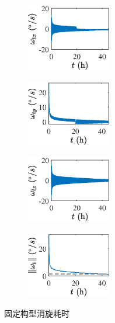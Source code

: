 \documentclass[lang=chs, degree=master, blindreview=false, winfonts=true]{yanputhesis}
\begin{document}
\begin{figure}[htb!]
	\centering
	\begin{minipage}[t]{0.96\textwidth}
		\centering
		\begin{subfigure}[t]{0.23\textwidth}
			\centering
			\includegraphics[width = 1.475in]{picture/posefix_omega_x.eps}
			\caption{ }
			\label{fig:posefixdetumb_time(a)}
		\end{subfigure}\hfill
		\begin{subfigure}[t]{0.23\textwidth}
			\centering
			\includegraphics[width = 1.475in]{picture/posefix_omega_y.eps}
			\caption{ }
			\label{fig:posefixdetumb_time(c)}
		\end{subfigure}\hfill
		\begin{subfigure}[t]{0.23\textwidth}
			\centering
			\includegraphics[width = 1.475in]{picture/posefix_omega_z.eps}
			\caption{ }
			\label{fig:posefixdetumb_time(e)}
		\end{subfigure}\hfill
		\begin{subfigure}[t]{0.23\textwidth}
			\centering
			\includegraphics[width = 1.475in]{picture/posefix_omega_norm.eps}
			\caption{ }
			\label{fig:posefixdetumb_time(g)}
		\end{subfigure}
	\end{minipage}
	\caption{固定构型消旋耗时\label{Fig.posefixdetumb_time}}
\end{figure}
\end{document}
